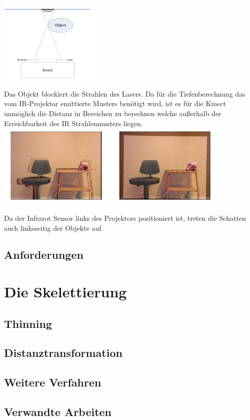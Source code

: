 \documentclass[appendixprefix,a4paper,bibliography=totoc,twoside=true,11pt,DIV=11,BCOR=6mm,headsepline,pointlessnumbers]{scrbook}
\begin{document}
\includegraphics[height=4cm]{Res/Schatten_Strahl.png}


Das Objekt blockiert die Strahlen des Lasers. Da für die Tiefenberechnung das vom IR-Projektor emittierte Musters benötigt wird, ist es für die Kinect unmöglich die Distanz in Bereichen zu berechnen welche außerhalb der Erreichbarkeit des IR Strahlenmusters liegen. \\

\includegraphics[height=4cm]{Res/Schatten.png}


Da der Infrarot Sensor links des Projektors positioniert ist, treten die Schatten auch linksseitig der Objekte auf. 


\section{Anforderungen}

\chapter{Die Skelettierung}
\section{Thinning}
\section{Distanztransformation}
\section{Weitere Verfahren}
\section{Verwandte Arbeiten}
\end{document}
